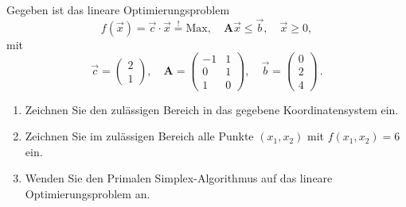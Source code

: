 \begin{Aufgabe}[9]

Gegeben ist das lineare Optimierungsproblem 
\[ 
 f(\vec x)=\vec c\cdot \vec x\stackrel{!}{=}\mathrm{Max}, \quad \mathbf A\vec x\leq \vec b,\quad \vec x\geq 0, 
\] 
mit 
\[ 
	\vec    c = \left(\begin{array}{c}  2\\ 1 \end{array}\right),\quad 
	\mathbf A = \left(\begin{array}{cc} -1 & 1\\ 0 & 1\\ 1 & 0 \end{array}\right),\quad 
	\vec    b = \left(\begin{array}{c}  0\\ 2\\ 4 \end{array}\right)\,. 
\] 

\begin{enumerate}
\item 	Zeichnen Sie den zulässigen Bereich in das gegebene Koordinatensystem ein.
\item 	Zeichnen Sie im zulässigen Bereich alle Punkte $(x_1,x_2)$ mit 
		$f(x_1,x_2)=6$ ein. 
\item 	Wenden Sie den Primalen Simplex-Algorithmus auf das lineare Optimierungsproblem an.
\end{enumerate}


\end{Aufgabe}

